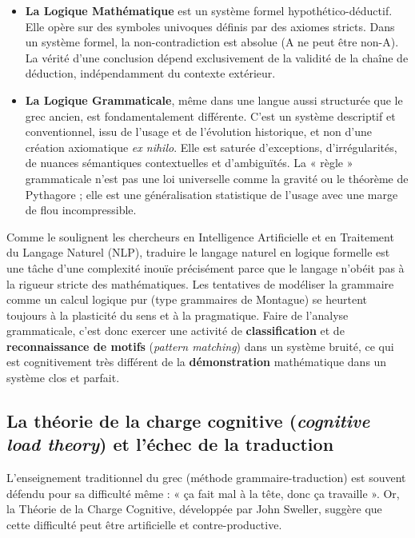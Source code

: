 \begin{itemize}\item \textbf{La Logique Mathématique} est un système formel hypothético-déductif. Elle opère sur des symboles univoques définis par des axiomes stricts. Dans un système formel, la non-contradiction est absolue (A ne peut être non-A). La vérité d'une conclusion dépend exclusivement de la validité de la chaîne de déduction, indépendamment du contexte extérieur.\cite{II-1-2-ref40}\item \textbf{La Logique Grammaticale}, même dans une langue aussi structurée que le grec ancien, est fondamentalement différente. C'est un système descriptif et conventionnel, issu de l'usage et de l'évolution historique, et non d'une création axiomatique \textit{ex nihilo}. Elle est saturée d'exceptions, d'irrégularités, de nuances sémantiques contextuelles et d'ambiguïtés.\cite{II-1-2-ref42} La « règle » grammaticale n'est pas une loi universelle comme la gravité ou le théorème de Pythagore ; elle est une généralisation statistique de l'usage avec une marge de flou incompressible.\end{itemize}Comme le soulignent les chercheurs en Intelligence Artificielle et en Traitement du Langage Naturel
(NLP), traduire le langage naturel en logique formelle est une tâche d'une complexité inouïe
précisément parce que le langage n'obéit pas à la rigueur stricte des
mathématiques.\cite{II-1-2-ref43} Les tentatives de modéliser la grammaire comme un calcul logique
pur (type grammaires de Montague) se heurtent toujours à la plasticité du sens et à la pragmatique.
Faire de l'analyse grammaticale, c'est donc exercer une activité de \textbf{classification} et de
\textbf{reconnaissance de motifs} (\textit{pattern matching}) dans un système bruité, ce qui est
cognitivement très différent de la \textbf{démonstration} mathématique dans un système clos et
parfait.\cite{II-1-2-ref30}



\subsection{La théorie de la charge cognitive (\textit{cognitive load theory}) et l'échec de la traduction}

L'enseignement traditionnel du grec (méthode grammaire-traduction) est souvent défendu pour sa
difficulté même : « ça fait mal à la tête, donc ça travaille ». Or, la Théorie de la Charge
Cognitive, développée par John Sweller, suggère que cette difficulté peut être artificielle et
contre-productive.\cite{II-1-2-ref45}

